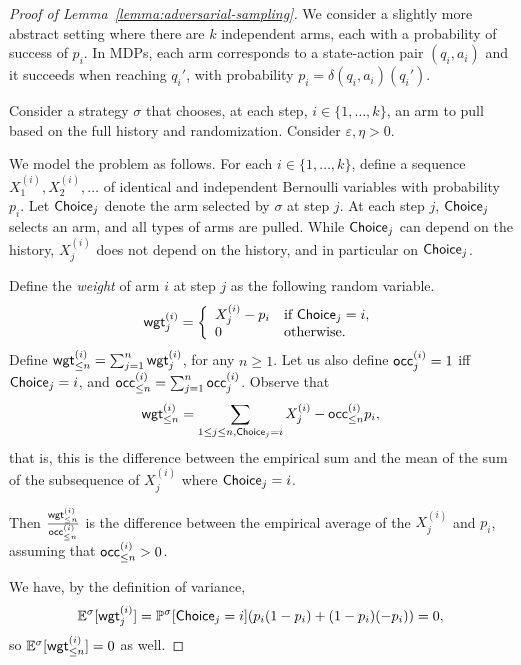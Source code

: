 \documentclass[a4paper,USenglish,cleveref, autoref, thm-restate]{lipics-v2021}
\let\epsilon\varepsilon
\newcommand*{\pr}{\mathbb{P}}
\newcommand*{\expect}{\mathbb{E}}
\def\Choice{\textrm{\sf Choice}}
\def\wgt{\textrm{\sf wgt}}
\def\occ{\textrm{\sf occ}}
\begin{document}
\begin{proof}[Proof of Lemma~\ref{lemma:adversarial-sampling}]
  We consider a slightly more abstract setting where there are $k$ independent arms,
  each with a probability of success of $p_i$.
  In MDPs, each arm corresponds to a state-action pair $(q_i,a_i)$ and it  succeeds when reaching $q_{i}'$, with probability $p_i=\delta(q_i,a_i)(q_i')$.

  Consider a strategy $\sigma$ that chooses, at each step, $i \in \{1,\ldots,k\}$, an arm to pull based on the full history and randomization.
  Consider $\epsilon,\eta>0$.

  We model the problem as follows.
  For each $i \in \{1,\ldots,k\}$, define a sequence $X_1^{(i)}, X_2^{(i)}, \ldots$ of identical and independent Bernoulli variables with probability $p_i$.
  Let $\Choice_j$ denote the arm selected by $\sigma$ at step $j$.
  At each step $j$, $\Choice_j$ selects an arm, and
  all types of arms are pulled.
  While $\Choice_j$ can depend on the history, $X_j^{(i)}$ does not depend on the history, and in particular on $\Choice_j$.

  Define the \emph{weight} of arm $i$ at step $j$ as the following random variable.
  \[
  \wgt_j^{(i)} = \left\{\begin{array}{ll}
    X_j^{(i)} - p_i & \text{if } \Choice_j=i,\\
    0 & \text{otherwise.}
  \end{array}\right.
  \]
  Define $\wgt_{\leq n}^{(i)} = \sum_{j=1}^n \wgt_j^{(i)}$, for any $n\geq 1$.
  Let us also define $\occ_j^{(i)} =1 $ iff $\Choice_j=i$, and $\occ_{\leq n}^{(i)}= \sum_{j=1}^n \occ_j^{(i)}$.
  Observe that 
  \[\wgt_{\leq n}^{(i)} = \sum_{1\leq j \leq n, \Choice_j=i} X_j^{(i)} - \occ_{\leq n}^{(i)} p_i,\]
  that is, this is the difference between the empirical sum and the mean of the sum of the subsequence of $X_j^{(i)}$ where $\Choice_j=i$.

  Then $\frac{\wgt_{\leq n}^{(i)}}{\occ_{\leq n}^{(i)}}$ is the difference between the empirical average of the $X^{(i)}_j$ and $p_i$,
  assuming that $\occ_{\leq n}^{(i)}>0$.

  We have, by the definition of variance,
  \[
    \expect^\sigma[\wgt_j^{(i)}] = \pr^\sigma[\Choice_j=i](p_i (1 - p_i) + (1-p_i)(-p_i)) = 0,
  \]
  so $\expect^\sigma[\wgt_{\leq n}^{(i)}] = 0$ as well.


\end{proof}
\end{document}
